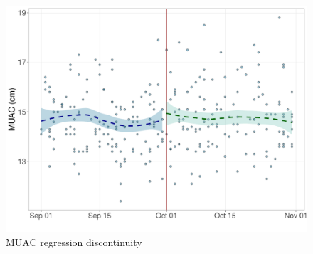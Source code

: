 \documentclass[12pt,a4paper]{article}
\begin{document}
\begin{figure}[H]

{\centering \includegraphics{kayinReport_files/figure-latex/rd5-1} 

}

\caption{MUAC regression discontinuity}\label{fig:rd5}
\end{figure}

\newpage

\renewcommand\refname{References}

\end{document}
